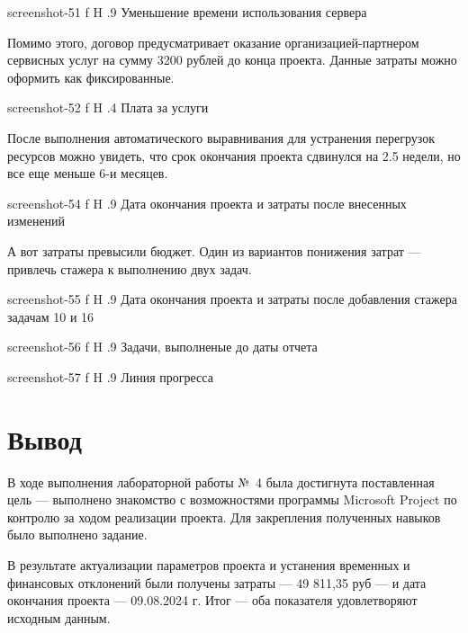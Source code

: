 \documentclass{bmstu}
\begin{document}
    {screenshot-51}
    {f}
    {H}
    {.9\textwidth}
    {Уменьшение времени использования сервера}

Помимо этого, договор предусматривает оказание организацией-партнером сервисных услуг на сумму 3200 рублей до конца проекта. 
Данные затраты можно оформить как фиксированные.

    {screenshot-52}
    {f}
    {H}
    {.4\textwidth}
    {Плата за услуги}
    
После выполнения автоматического выравнивания для устранения перегрузок ресурсов можно увидеть, что срок окончания проекта сдвинулся на 2.5 недели, но все еще меньше 6-и месяцев. 
    
    {screenshot-54}
    {f}
    {H}
    {.9\textwidth}
    {Дата окончания проекта и затраты после внесенных изменений}
    
А вот затраты превысили бюджет. 
Один из вариантов понижения затрат --- привлечь стажера к выполнению двух задач.

    {screenshot-55}
    {f}
    {H}
    {.9\textwidth}
    {Дата окончания проекта и затраты после добавления стажера задачам 10 и 16}
    
    {screenshot-56}
    {f}
    {H}
    {.9\textwidth}
    {Задачи, выполненые до даты отчета}
    
    {screenshot-57}
    {f}
    {H}
    {.9\textwidth}
    {Линия прогресса}
    
\section{Вывод}

В ходе выполнения лабораторной работы №~4 была достигнута поставленная цель --- выполнено знакомство с возможностями программы Microsoft Project по контролю за ходом реализации проекта. 
Для закрепления полученных навыков было выполнено задание.

В результате актуализации параметров проекта и устанения временных и финансовых отклонений были получены затраты --- 49 811,35 руб --- и дата окончания проекта --- 09.08.2024 г. 
Итог --- оба показателя удовлетворяют исходным данным.
\end{document}
